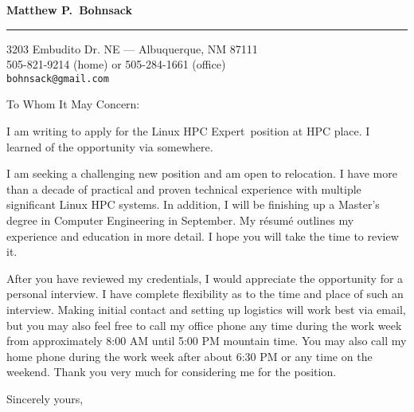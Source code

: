 \documentclass{letter} %
\begin{document}
\newcommand{\me}{Matthew P.~Bohnsack}
\newcommand{\position}{Linux HPC Expert}
\newcommand{\employer}{HPC place}
\newcommand{\via}{somewhere}

\signature{\me}                           %
\longindentation=0pt                      %
\let\raggedleft\raggedright               %


\begin{letter}{}%


\begin{flushleft}
\textbf{\Large\textcolor{MyNameColor}{{\selectfont \me}}}
\end{flushleft}
\medskip\hrule height 1pt
\begin{flushright}
\hfill 3203 Embudito Dr. NE --- Albuquerque, NM 87111 \\
\hfill 505-821-9214 (home) or 505-284-1661 (office) \\
\hfill \texttt{bohnsack@gmail.com}
\end{flushright}
\vfill %


\opening{To Whom It May Concern:}

\noindent I am writing to apply for the \position~position at \employer.  I
learned of the opportunity via \via.

\noindent I am seeking a challenging new position and am open to relocation.  I
have more than a decade of practical and proven technical experience with
multiple significant Linux HPC systems.  In addition, I will be finishing up a
Master's degree in Computer Engineering in September.  My r\'{e}sum\'{e}
outlines my experience and education in more detail.  I hope you will take the
time to review it.

\noindent After you have reviewed my credentials, I would appreciate the
opportunity for a personal interview.  I have complete flexibility as to the
time and place of such an interview.  Making initial contact and setting up
logistics will work best via email, but you may also feel free to call my
office phone any time during the work week from approximately 8:00 AM until 5:00
PM mountain time.  You may also call my home phone during the work week after
about 6:30 PM or any time on the weekend.  Thank you very much for considering
me for the position.

\closing{Sincerely yours,}



\end{letter}
\end{document}

